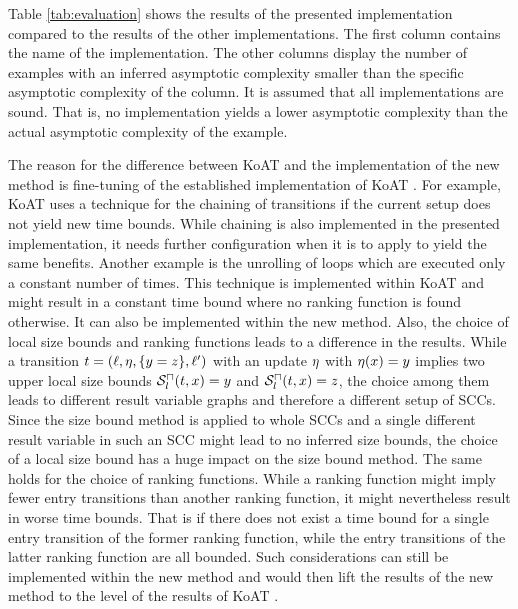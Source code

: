 Table \ref{tab:evaluation} shows the results of the presented implementation compared to the results of the other implementations.
The first column contains the name of the implementation.
The other columns display the number of examples with an inferred asymptotic complexity smaller than the specific asymptotic complexity of the column.
It is assumed that all implementations are sound.
That is, no implementation yields a lower asymptotic complexity than the actual asymptotic complexity of the example.

The reason for the difference between KoAT \cite{koat} and the implementation of the new method is fine-tuning of the established implementation of KoAT \cite{koat}.
For example, KoAT \cite{koat} uses a technique for the chaining of transitions if the current setup does not yield new time bounds.
While chaining is also implemented in the presented implementation, it needs further configuration when it is to apply to yield the same benefits.
Another example is the unrolling of loops which are executed only a constant number of times.
This technique is implemented within KoAT \cite{koat} and might result in a constant time bound where no ranking function is found otherwise.
It can also be implemented within the new method.
Also, the choice of local size bounds and ranking functions leads to a difference in the results.
While a transition $t = (\ell, \eta, \lbrace y=z \rbrace, \ell')$ with an update $\eta$ with $\eta(x)=y$ implies two upper local size bounds ${\mathcal{S}^\sqcap_l}(t,x)=y$ and ${\mathcal{S}^\sqcap_l}(t,x)=z$, the choice among them leads to different result variable graphs and therefore a different setup of SCCs.
Since the size bound method is applied to whole SCCs and a single different result variable in such an SCC might lead to no inferred size bounds, the choice of a local size bound has a huge impact on the size bound method.
The same holds for the choice of ranking functions.
While a ranking function might imply fewer entry transitions than another ranking function, it might nevertheless result in worse time bounds.
That is if there does not exist a time bound for a single entry transition of the former ranking function, while the entry transitions of the latter ranking function are all bounded.
Such considerations can still be implemented within the new method and would then lift the results of the new method to the level of the results of KoAT \cite{koat}.
